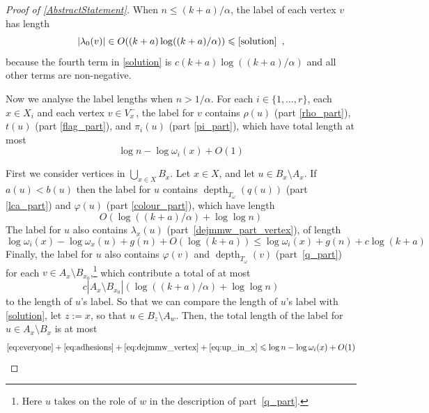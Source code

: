 \documentclass{patmorin}
\DeclareMathOperator{\depth}{depth}
\renewcommand{\le}{\leqslant}
\let\eqref\cref
\begin{document}
\begin{proof}[Proof of \cref{AbstractStatement}]
    When $n\le (k+a)/\alpha$, the label of each vertex $v$ has length
    \[
        |\lambda_0(v)|\in O((k+a)\log((k+a)/\alpha))
        \le \eqref{solution} \enspace ,
    \]
    because the fourth term in \eqref{solution} is $c(k+a)\log((k+a)/\alpha)$ and all other terms are non-negative.

    Now we analyse the label lengths when $n> 1/\alpha$.
    For each $i\in\{1,\ldots,r\}$, each $x\in X_i$ and each vertex $v\in V^-_x$, the label for $v$ contains $\rho(u)$ (part \ref{rho_part}), $t(u)$ (part \ref{flag_part}), and $\pi_i(u)$ (part \ref{pi_part}), which have total length at most
    \begin{equation}
       \log n - \log \omega_i(x) + O(1)  \label{eq:everyone}
    \end{equation}

    First we consider vertices in $\bigcup_{x\in X} B_x$.
    Let $x\in X$, and let $u\in B_x\setminus A_x$.  If $a(u)<b(u)$ then the label for $u$ contains $\depth_{T_\omega}(q(u))$ (part \ref{lca_part}) and $\varphi(u)$ (part \ref{colour_part}), which have length
    \begin{equation}
      O(\log((k+a)/\alpha) + \log\log n) \label{eq:adhesions}
    \end{equation}
    The label for $u$ also contains $\lambda_x(u)$ (part~\ref{dejmmw_part_vertex}), of length
    \begin{equation}
       \log \omega_i(x) - \log \omega_x(u) + g(n) + O(\log(k+a))
       \le \log\omega_i(x) + g(n) + c\log(k+a) \label{eq:dejmmw_vertex}
    \end{equation}
    Finally, the label for $u$ also contains $\varphi(v)$ and $\depth_{T_\omega}(v)$ (part~\ref{q_part}) for each $v\in A_x\setminus B_{x_0}$,\footnote{Here $u$ takes on the role of $w$ in the description of part~\ref{q_part}.} which contribute a total of at most
    \begin{equation}
       c|A_x\setminus B_{x_0}|(\log((k+a)/\alpha) + \log\log n)
       \label{eq:up_in_x}
    \end{equation}
    to the length of $u$'s label.  So that we can compare the length of $u$'s label with \eqref{solution}, let $z:=x$, so that $u\in B_z\setminus A_w$.  Then, the total length of the label for $u\in A_x\setminus B_x$ is at most
    \begin{align*}
       \eqref{eq:everyone} + \eqref{eq:adhesions} + \eqref{eq:dejmmw_vertex} + \eqref{eq:up_in_x}
       & \le
       \log n -\log \omega_i(x) + O(1) \\

\end{align*}
\end{proof}
\end{document}
